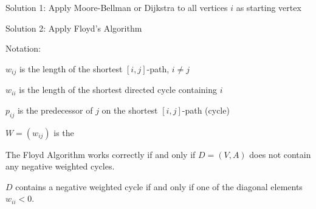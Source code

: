 \begin{lec}[2011-10-24]\end{lec}


Solution 1: Apply Moore-Bellman or Dijkstra to all vertices $i$ as starting vertex

Solution 2: Apply Floyd's Algorithm

Notation: 

$w_{ij}$ is the length of the shortest $[i,j]$-path, $i \neq j$

$w_{ii}$ is the length of the shortest directed cycle containing $i$

$p_{ij}$ is the predecessor of $j$ on the shortest $[i,j]$-path (cycle)

$W =(w_{ij}) $ is the 


\begin{thm} %
The Floyd Algorithm works correctly if and only if $D = (V,A)$ does not contain any negative weighted cycles.

$D$ contains a negative weighted cycle if and only if one of the diagonal elements $w_{ii}<0$.
\end{thm}

